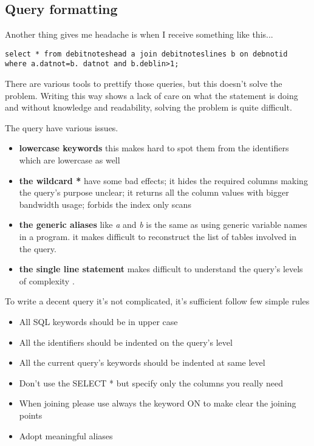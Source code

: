 \subsection{Query formatting}
Another thing gives me headache is when I receive something like this...

\begin{verbatim}
select * from debitnoteshead a join debitnoteslines b on debnotid 
where a.datnot=b. datnot and b.deblin>1;
\end{verbatim}

There are various tools to prettify those queries, but this doesn't solve the problem.
Writing this way shows a lack of care on what the statement is doing and without knowledge and 
readability, solving the problem is quite difficult.\newline

The query have various issues.

\begin{itemize}
 \item \textbf{lowercase keywords} this makes hard to spot them from the identifiers which are 
lowercase as well
\item \textbf{the wildcard *} have some bad effects; it hides the required columns 
making the query's purpose unclear; it returns all the column values with bigger bandwidth usage; 
forbids the index only scans
\item \textbf{the generic aliases} like \textit{a} and \textit{b} is the same as using generic 
variable names in a program. it makes difficult to reconstruct the list of tables involved in the 
query.
\item \textbf{the single line statement} makes difficult to understand the query's levels of 
complexity .
\end{itemize}

To write a decent query it's not complicated, it's sufficient follow few simple rules

\begin{itemize}
 \item All SQL keywords should be in upper case
 \item All the identifiers should be indented on the query's level
 \item All the current query's keywords should be indented at same level
 \item Don't use the SELECT * but specify only the columns you really need
 \item When joining please use always the keyword ON to make clear the joining points
 \item Adopt meaningful aliases
\end{itemize}

